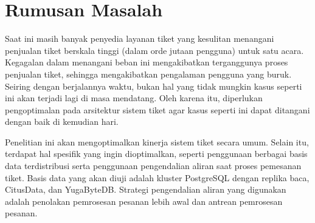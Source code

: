 \section{Rumusan Masalah}

Saat ini masih banyak penyedia layanan tiket yang kesulitan menangani penjualan tiket berskala tinggi (dalam orde jutaan pengguna) untuk satu acara. Kegagalan dalam menangani beban ini mengakibatkan terganggunya proses penjualan tiket, sehingga mengakibatkan pengalaman pengguna yang buruk. Seiring dengan berjalannya waktu, bukan hal yang tidak mungkin kasus seperti ini akan terjadi lagi di masa mendatang. Oleh karena itu, diperlukan pengoptimalan pada arsitektur sistem tiket agar kasus seperti ini dapat ditangani dengan baik di kemudian hari.

Penelitian ini akan mengoptimalkan kinerja sistem tiket secara umum. Selain itu, terdapat hal spesifik yang ingin dioptimalkan, seperti penggunaan berbagai basis data terdistribusi serta penggunaan pengendalian aliran saat proses pemesanan tiket. Basis data yang akan diuji adalah kluster PostgreSQL dengan replika baca, CitusData, dan YugaByteDB. Strategi pengendalian aliran yang digunakan adalah penolakan pemrosesan pesanan lebih awal dan antrean pemrosesan pesanan.

